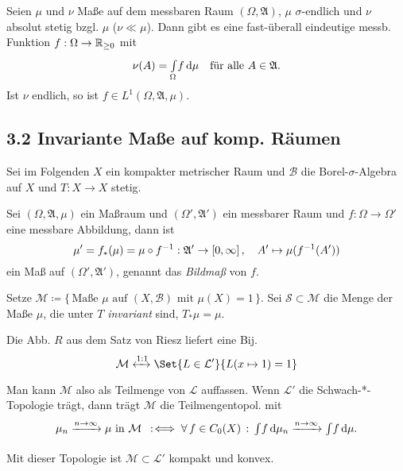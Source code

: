 \documentclass{cheat-sheet}
\newcommand{\Bor}{\mathcal{B}} %
\newcommand{\Lin}{\mathcal{L}} %
\newcommand{\Alg}{\mathfrak{A}} %
\newcommand{\Meas}{\mathcal{M}} %
\begin{document}
\begin{thm}
  Seien $\mu$ und $\nu$ Maße auf dem messbaren Raum $(\Omega, \Alg)$, $\mu$ $\sigma$-endlich und $\nu$ absolut stetig bzgl. $\mu$ ($\nu \ll \mu$).
  Dann gibt es eine fast-überall eindeutige messb. Funktion $f : \Omega \to \mathbb{R}_{\geq 0}$ mit
  \[
    \nu(A) = \Int{\Omega}{}{f}{\mu} \quad
    \text{für alle $A \in \Alg$}.
  \]
  Ist $\nu$ endlich, so ist $f \in L^1(\Omega, \Alg, \mu)$.
\end{thm}

\begin{samepage}
  \section{3.2 Invariante Maße auf komp. Räumen}
\end{samepage}

\begin{bem}
  Sei im Folgenden $X$ ein kompakter metrischer Raum und $\Bor$ die Borel-$\sigma$-Algebra auf $X$ und $T : X \to X$ stetig.
\end{bem}

\begin{defn}
  Sei $(\Omega, \Alg, \mu)$ ein Maßraum und $(\Omega', \Alg')$ ein messbarer Raum und $f : \Omega \to \Omega'$ eine messbare Abbildung, dann ist
  \[ \mu' = f_*(\mu) = \mu \circ f^{-1} : \Alg' \to \cinterval{0}{\infty}, \quad A' \mapsto \mu(f^{-1}(A')) \]
  ein Maß auf $(\Omega', \Alg')$, genannt das \emph{Bildmaß} von $f$.
\end{defn}

\begin{defn}
  Setze $\Meas \coloneqq \{ \, \text{Maße $\mu$ auf $(X, \Bor)$ mit $\mu(X) = 1$} \, \}$.
  Sei $\mathcal{S} \subset \Meas$ die Menge der Maße $\mu$, die unter $T$ \emph{invariant} sind, \dh{} $T_* \mu = \mu$.
\end{defn}

\begin{kor}
  Die Abb. $R$ aus dem Satz von Riesz liefert eine Bij.
  \[ \Meas \xleftrightarrow{1:1} \Set{L \in \Lin'}{L(x \mapsto 1) = 1} \]
\end{kor}

\begin{bem}
  Man kann $\Meas$ also als Teilmenge von $\mathcal{L}$ auffassen.
  Wenn $\Lin'$ die Schwach-*-Topologie trägt, dann trägt $\Meas$ die Teilmengentopol. mit
  \[
    \mu_n \xrightarrow{n \to \infty} \mu \text{ in $\Meas$} \coloniff
    \fa{f \in C_0(X)} \Int{}{}{f}{\mu_n} \xrightarrow{n \to \infty} \Int{}{}{f}{\mu}.
  \]
  Mit dieser Topologie ist $\Meas \subset \Lin'$ kompakt und konvex.
\end{bem}
\end{document}
